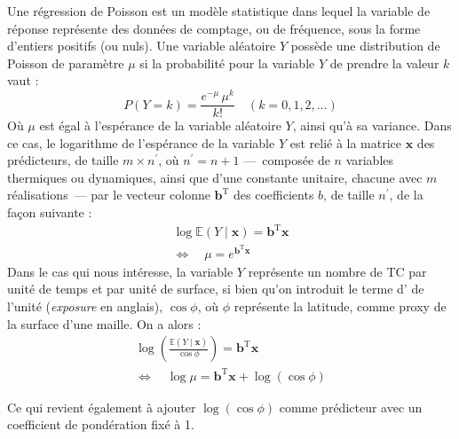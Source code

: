\documentclass[../main.tex]{subfiles}
\begin{document}
Une régression de Poisson est un modèle statistique dans lequel la variable de réponse représente des données de comptage, ou de fréquence, sous la forme
d'entiers positifs (ou nuls). Une variable aléatoire $Y$ possède une distribution de Poisson de paramètre $\mu$ si la probabilité pour la variable $Y$
de prendre la valeur $k$ vaut :
%
\begin{equation*}
    P(Y = k) = \frac{e^{-\mu} \, \mu^k}{k!} \quad (k=0, 1, 2, \ldots) 
\end{equation*}
%
Où $\mu$ est égal à l'espérance de la variable aléatoire $Y$, ainsi qu'à sa variance. Dans ce cas, le logarithme de l'espérance de la variable $Y$ est relié
à la matrice $\mathbf{x}$ des prédicteurs, de taille $m \times n^\prime$, où $n^\prime = n + 1$ ---~composée de $n$ variables thermiques ou dynamiques, ainsi que
d'une constante unitaire, chacune avec $m$ réalisations~--- par le vecteur colonne $\mathbf{b}^{\mathrm{T}}$ des coefficients $b$, de taille $n^\prime$, de la
façon suivante :
%
\begin{gather*}
    \log \mathbb{E} \left( Y \mid \mathbf{x} \right ) = \mathbf{b}^{\mathrm{T}} \mathbf{x} \\
    \Leftrightarrow \quad \mu = e^{\mathbf{b}^{\mathrm{T}} \mathbf{x}}
\end{gather*}
%
Dans le cas qui nous intéresse, la variable $Y$ représente un nombre de TC par unité de temps et par unité de surface, si bien qu'on introduit le terme
d' de l'unité (\textit{exposure} en anglais), $\cos \phi$, où $\phi$ représente la latitude, comme proxy de la surface d'une maille. On a
alors :
%
\begin{equation}
    \begin{gathered}\label{eq:poisson_reg}
        \log \left( \frac{\mathbb{E} \left( Y \mid \mathbf{x}\right )}{\cos \phi} \right) = \mathbf{b}^{\mathrm{T}} \mathbf{x} \\
        \Leftrightarrow \quad \log \mu = \mathbf{b}^{\mathrm{T}} \mathbf{x} + \log (\cos \phi)
    \end{gathered}
\end{equation}

%
Ce qui revient également à ajouter $\log (\cos \phi)$ comme prédicteur avec un coefficient de pondération fixé à 1.
\end{document}
